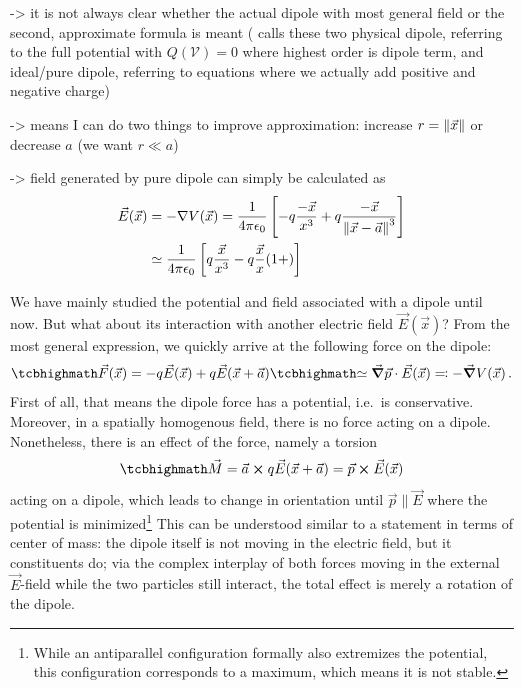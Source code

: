 \documentclass[../class_mech_main.tex]{subfiles}
\DeclareMathOperator{\fpeps}{\frac{1}{4 \pi \epsilon_0}}
\begin{document}
-> it is not always clear whether the actual dipole with most general field or the second, approximate formula is meant (\cite{Griffiths_2017} calls these two physical dipole, referring to the full potential with $Q(\mathcal{V}) = 0$ where highest order is dipole term, and ideal/pure dipole, referring to equations where we actually add positive and negative charge)

-> means I can do two things to improve approximation: increase $r = \norm{\vec{x}}$ or decrease $a$ (we want $r \ll a$)


-> field generated by pure dipole can simply be calculated as
\begin{align}
    \vec{E}(\vec{x}) &= - \nabla V(\vec{x}) = \fpeps \qty[-q \frac{-\vec{x}}{x^3} + q \frac{-\vec{x}}{\norm{\vec{x} - \vec{a}}^3}]
    \\
    &\simeq \fpeps \qty[q \frac{\vec{x}}{x^3} - q \frac{\vec{x}}{x} (1 + )]
\end{align}



We have mainly studied the potential and field associated with a dipole until now. But what about its interaction with another electric field $\vec{E}(\vec{x})$? From the most general expression, we quickly arrive at the following force on the dipole:
\begin{equation}
    \eqbox{
        \vec{F}(\vec{x})
    }
    = - q \vec{E}(\vec{x}) + q \vec{E}(\vec{x} + \vec{a})
    \eqbox{
        \simeq \grad \vec{p} \cdot \vec{E}(\vec{x})
    }
    \eqqcolon - \grad V(\vec{x})
    \, .
\end{equation}
First of all, that means the dipole force has a potential, i.e.~is conservative. Moreover, in a spatially homogenous field, there is no force acting on a dipole. Nonetheless, there is an effect of the force, namely a torsion
\begin{equation}
    \eqbox{
        \vec{M}
        = \vec{a} \cross q \vec{E}(\vec{x} + \vec{a})
        = \vec{p} \cross \vec{E}(\vec{x})
    }
\end{equation}
acting on a dipole, which leads to change in orientation until $\vec{p} \parallel \vec{E}$ where the potential is minimized\footnote{While an antiparallel configuration formally also extremizes the potential, this configuration corresponds to a maximum, which means it is not stable.} This can be understood similar to a statement in terms of center of mass: the dipole itself is not moving in the electric field, but it constituents do; via the complex interplay of both forces moving in the external $\vec{E}$-field while the two particles still interact, the total effect is merely a rotation of the dipole.
\end{document}
